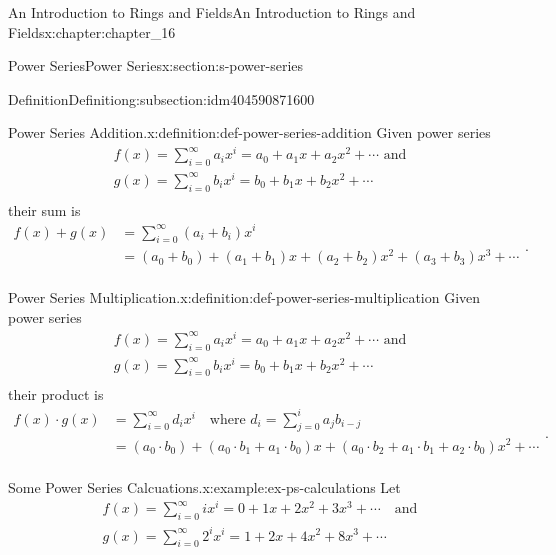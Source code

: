 \documentclass[twoside,10pt,]{book}
\numberwithin{equation}{section}
\begin{document}
\begin{chapterptx}{An Introduction to Rings and Fields}{}{An Introduction to Rings and Fields}{}{}{x:chapter:chapter_16}
\begin{sectionptx}{Power Series}{}{Power Series}{}{}{x:section:s-power-series}
\begin{subsectionptx}{Definition}{}{Definition}{}{}{g:subsection:idm404590871600}
\begin{definition}{Power Series Addition.}{x:definition:def-power-series-addition}
Given power series%
\begin{equation*}
\begin{array}{c}
f(x)=\sum_{i=0}^{\infty } a_i x^i=a_0 + a_1 x+a_2 x^2+ \cdots\textrm{  and}\\
g(x)=\sum_{i=0}^{\infty } b_i x^i=b_0 + b_1 x+b_2 x^2+ \cdots\\
\end{array}
\end{equation*}
their sum is%
\begin{equation*}
\begin{split}
f(x)+g(x)&=\sum_{i=0}^{\infty }\left(a_i+b_i\right) x^i\\
&=(a_0 +b_0) + (a_1+b_1) x+(a_2+b_2) x^2+(a_3+b_3) x^3+ \cdots \\
\end{split}\text{.}
\end{equation*}
%
\end{definition}
\begin{definition}{Power Series Multiplication.}{x:definition:def-power-series-multiplication}%
Given power series%
\begin{equation*}
\begin{array}{c}
f(x)=\sum_{i=0}^{\infty } a_i x^i=a_0 + a_1 x+a_2 x^2+ \cdots\textrm{  and}\\
g(x)=\sum_{i=0}^{\infty } b_i x^i=b_0 + b_1 x+b_2 x^2+ \cdots\\
\end{array}
\end{equation*}
their product is%
\begin{equation*}
\begin{split}
f(x)\cdot g(x)&=\sum_{i=0}^{\infty } d_i x^i \quad \textrm{where }d_i= \sum_{j=0}^i a_j b_{i-j}\\
&=(a_0\cdot b_0) + (a_0\cdot b_1+a_1\cdot b_0) x+(a_0\cdot b_2+a_1\cdot b_1+a_2\cdot b_0) x^2+ \cdots  \\
\end{split}\text{.}
\end{equation*}
%
\end{definition}
\begin{example}{Some Power Series Calcuations.}{x:example:ex-ps-calculations}%
Let%
\begin{equation*}
\begin{array}{c}
f(x)=\sum_{i=0}^{\infty}  i x^i=0 + 1 x+2 x^2+3x^3+ \cdots \quad \textrm{and}\\
g(x)=\sum_{i=0}^{\infty} 2^i x^i=1 +2 x+4 x^2+8x^3+ \cdots \\

\end{array}
\end{equation*}
\end{example}
\end{subsectionptx}
\end{sectionptx}
\end{chapterptx}
\end{document}
